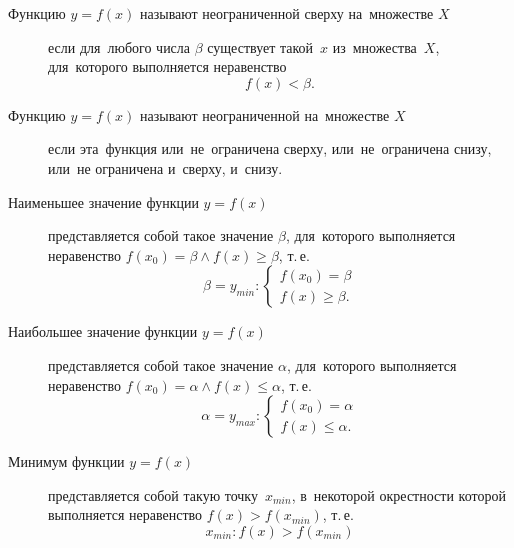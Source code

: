\documentclass[]{scrartcl}
\begin{document}
\begin{description}
	\item[Функцию ${\textstyle y=f(x)}$ называют неограниченной сверху на~множестве ${\textstyle X}$] если для~любого числа ${\textstyle \beta}$ существует такой~${\textstyle x}$  из~множества~${\textstyle X}$, для~которого выполняется неравенство
	\begin{equation}\label{eq:function-5}
	f(x) < \beta.
	\end{equation}
\end{description}
\begin{description}
	\item[Функцию ${\textstyle y=f(x)}$ называют неограниченной на~множестве ${\textstyle X}$] если эта~функция или~не~ограничена сверху, или~не~ограничена снизу, или~не ограничена и~сверху, и~снизу.
\end{description}
\begin{description}
	\item[Наименьшее значение функции ${\textstyle y=f(x)}$] представляется собой такое значение ${\textstyle \beta}$, для~которого выполняется неравенство ${\textstyle f(x_0)=\beta \wedge f(x)\geq \beta}$, т.\,е.
	\begin{equation}\label{eq:function-10}
	\beta = y_{min}:
	\begin{cases}
	f(x_0)=\beta\\
	f(x)\geq \beta.
	\end{cases}
	\end{equation}
\end{description}
\begin{description}
	\item[Наибольшее значение функции ${\textstyle y=f(x)}$] представляется собой такое значение ${\textstyle \alpha}$, для~которого выполняется неравенство ${\textstyle f(x_0)=\alpha \wedge f(x)\leq \alpha}$, т.\,е.
	\begin{equation}\label{eq:function-11}
	\alpha = y_{max}:
	\begin{cases}
	f(x_0)=\alpha\\
	f(x)\leq \alpha.
	\end{cases}
	\end{equation}
\end{description}

\begin{description}
	\item[Минимум функции ${\textstyle y=f(x)}$] представляется собой такую точку~${\textstyle x_{min}}$, в~некоторой окрестности которой выполняется неравенство ${\textstyle f(x)>f(x_{min})}$, т.\,е.
	\begin{equation}\label{eq:function-12}
	x_{min}:f(x)>f(x_{min})
	\end{equation}
\end{description}
\end{document}
